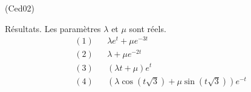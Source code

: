\begin{tiny}(Ced02)\end{tiny} Résultats. Les paramètres $\lambda$ et $\mu$ sont réels.
\begin{align*}
 &(1)& &\lambda e^{t} + \mu e^{-3 t}\\
 &(2)& &\lambda  + \mu e^{-2 t}\\
 &(3)& &(\lambda t + \mu) e^{ t}\\
 &(4)& &\left(\lambda \cos(t\sqrt{3})+\mu \sin(t\sqrt{3}) \right)e^{-t} \\
\end{align*}

